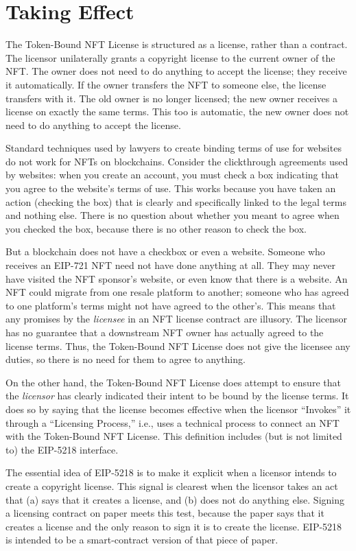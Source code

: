 \documentclass{article}
\newcommand{\eiplicense}{EIP-5218\xspace}
\newcommand{\iccclicense}{Token-Bound NFT License\xspace}
\begin{document}
\section{Taking Effect}

The \iccclicense is structured as a license, rather than a contract. The licensor unilaterally grants a copyright license to the current owner of the NFT. The owner does not need to do anything to accept the license; they receive it automatically. If the owner transfers the NFT to someone else, the license transfers with it. The old owner is no longer licensed; the new owner receives a license on exactly the same terms. This too is automatic, the new owner does not need to do anything to accept the license.

Standard techniques used by lawyers to create binding terms of use for websites do not work for NFTs on blockchains. Consider the clickthrough agreements used by websites: when you create an account, you must check a box indicating that you agree to the website's terms of use. This works because you have taken an action (checking the box) that is clearly and specifically linked to the legal terms and nothing else. There is no question about whether you meant to agree when you checked the box, because there is no other reason to check the box. 

But a blockchain does not have a checkbox or even a website. Someone who receives an EIP-721 NFT need not have done anything at all. They may never have visited the NFT sponsor's website, or even know that there is a website. An NFT could migrate from one resale platform to another; someone who has agreed to one platform's terms might not have agreed to the other's. This means that any promises by the \emph{licensee} in an NFT license contract are illusory. The licensor has no guarantee that a downstream NFT owner has actually agreed to the license terms. Thus, the \iccclicense does not give the licensee any duties, so there is no need for them to agree to anything.

On the other hand, the \iccclicense does attempt to ensure that the \emph{licensor} has clearly indicated their intent to be bound by the license terms. It does so by saying that the license becomes effective when the licensor ``Invokes'' it through a ``Licensing Process,'' i.e., uses a technical process to connect an NFT with the \iccclicense. This definition includes (but is not limited to) the \eiplicense interface. 

The essential idea of \eiplicense  is to make it explicit when a licensor intends to create a copyright license. This signal is clearest when the licensor takes an act that (a) says that it creates a license, and (b) does not do anything else. Signing a licensing contract on paper meets this test, because the paper says that it creates a license and the only reason to sign it is to create the license. \eiplicense is intended to be a smart-contract version of that piece of paper. 
\end{document}
